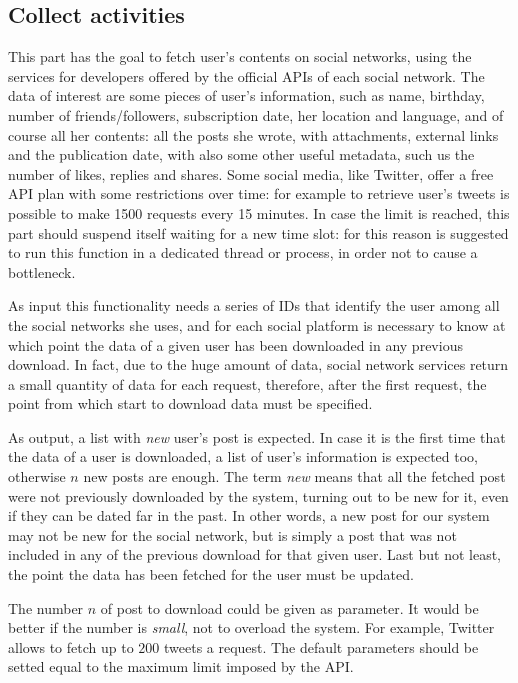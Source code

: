\subsection{Collect activities}
This part has the goal to fetch user's contents on social networks, using the services for developers offered by the official APIs of each social network. The data of interest are some pieces of user's information, such as name, birthday, number of friends/followers, subscription date, her location and language, and of course all her contents: all the posts she wrote, with attachments, external links and the publication date, with also some other useful metadata, such us the number of likes, replies and shares. Some social media, like Twitter, offer a free API plan with some restrictions over time: for example to retrieve user's tweets is possible to make 1500 requests every 15 minutes. In case the limit is reached, this part should suspend itself waiting for a new time slot: for this reason is suggested to run this function in a dedicated thread or process, in order not to cause a bottleneck.

As input this functionality needs a series of IDs that identify the user among all the social networks she uses, and for each social platform is necessary to know at which point the data of a given user has been downloaded in any previous download. In fact, due to the huge amount of data, social network services return a small quantity of data for each request, therefore, after the first request, the point from which start to download data must be specified.

As output, a list with \emph{new} user's post is expected. In case it is the first time that the data of a user is downloaded, a list of user's information is expected too, otherwise $ n $ new posts are enough. The term \emph{new} means that all the fetched post were not previously downloaded by the system, turning out to be new for it, even if they can be dated far in the past. In other words, a new post for our system may not be new for the social network, but is simply a post that was not included in any of the previous download for that given user. Last but not least, the point the data has been fetched for the user must be updated.

The number $ n $ of post to download could be given as parameter. It would be better if the number is \emph{small}, not to overload the system. For example, Twitter allows to fetch up to $ 200 $ tweets a request. The default parameters should be setted equal to the maximum limit imposed by the API.

